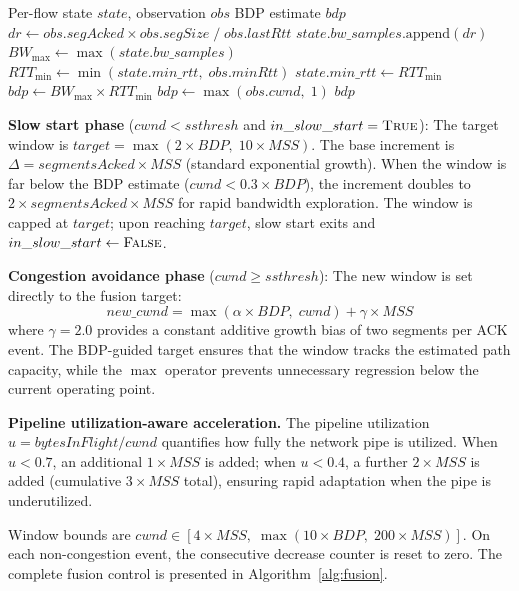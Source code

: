 \documentclass[10pt,twocolumn]{article}
\begin{document}
\begin{algorithm}[htbp]
\caption{Windowed Max-Filter BDP Estimation}
\label{alg:bdp}
\small
\begin{algorithmic}[1]
\REQUIRE Per-flow state $state$, observation $obs$
\ENSURE BDP estimate $bdp$
\STATE $dr \leftarrow obs.segAcked \times obs.segSize \;/\; obs.lastRtt$
\STATE $state.bw\_samples.\text{append}(dr)$ 
\STATE $BW_{\max} \leftarrow \max(state.bw\_samples)$
\STATE $RTT_{\min} \leftarrow \min(state.min\_rtt, \; obs.minRtt)$
\STATE $state.min\_rtt \leftarrow RTT_{\min}$
\STATE $bdp \leftarrow BW_{\max} \times RTT_{\min}$
    \STATE $bdp \leftarrow \max(obs.cwnd, \; 1)$ 
\ENDIF
\RETURN $bdp$
\end{algorithmic}
\end{algorithm}

\textbf{Slow start phase} ($cwnd < ssthresh$ and $in\_slow\_start = \textsc{True}$): The target window is $target = \max(2 \times BDP, \; 10 \times MSS)$. The base increment is $\Delta = segmentsAcked \times MSS$ (standard exponential growth). When the window is far below the BDP estimate ($cwnd < 0.3 \times BDP$), the increment doubles to $2 \times segmentsAcked \times MSS$ for rapid bandwidth exploration. The window is capped at $target$; upon reaching $target$, slow start exits and $in\_slow\_start \leftarrow \textsc{False}$.

\textbf{Congestion avoidance phase} ($cwnd \geq ssthresh$): The new window is set directly to the fusion target:
\begin{equation}
\label{eq:fusion}
new\_cwnd = \max(\alpha \times BDP, \; cwnd) + \gamma \times MSS
\end{equation}
where $\gamma = 2.0$ provides a constant additive growth bias of two segments per ACK event. The BDP-guided target ensures that the window tracks the estimated path capacity, while the $\max$ operator prevents unnecessary regression below the current operating point.

\textbf{Pipeline utilization-aware acceleration.} The pipeline utilization $u = bytesInFlight / cwnd$ quantifies how fully the network pipe is utilized. When $u < 0.7$, an additional $1 \times MSS$ is added; when $u < 0.4$, a further $2 \times MSS$ is added (cumulative $3 \times MSS$ total), ensuring rapid adaptation when the pipe is underutilized.

Window bounds are $cwnd \in [4 \times MSS, \; \max(10 \times BDP, \; 200 \times MSS)]$. On each non-congestion event, the consecutive decrease counter is reset to zero. The complete fusion control is presented in Algorithm~\ref{alg:fusion}.
\end{document}
